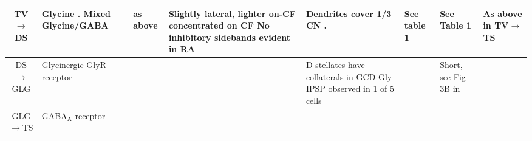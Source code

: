 \begin{longtable}{cYYYYYYY}
TV\ensuremath{\rightarrow}DS                        
                                & %
Glycine \citep{OstapoffMorestEtAl:1999,SaintBensonEtAl:1991}. 
Mixed  Glycine/GABA \citep{OsenOttersenEtAl:1990}                 
                                & %
\citep{OstapoffMorestEtAl:1999}  as above                                  
                                & %
Slightly lateral, lighter on-CF \citep{OstapoffMorestEtAl:1999}
concentrated on CF \citep{ZhangOertel:1993} 
No inhibitory sidebands evident in RA                                   
                                & %
Dendrites cover 1/3 CN \citep[guinea pig][]{PalmerJiangEtAl:1996}.
                                & See table 1 \citep{SmithRhode:1989}     
                                & See Table 1 \citep{SmithRhode:1989}                          
                                & 
As above in TV\ensuremath{\rightarrow}TS
\\ \midrule
DS\ensuremath{\rightarrow}GLG                                 
                                & 
Glycinergic GlyR receptor                  
                                & %
                                & 
                                & 
D stellates have collaterals in GCD \citep[mouse][]{OertelWuEtAl:1990}
Gly IPSP observed in 1 of 5 cells \citep{FerragamoGoldingEtAl:1998}    
                                & 
                                & %
Short, see Fig 3B in \citep{FerragamoGoldingEtAl:1998}
\\ \midrule
GLG\ensuremath{\rightarrow}TS                         
                                & %
GABA$_{\textrm{A}}$ receptor  \citep[bicuculine-sensitive VCN T stellate cell, mouse slice preparation][]{FerragamoGoldingEtAl:1998} \citep[Chinchilla][]{JosephsonMorest:1998}

\end{longtable}
